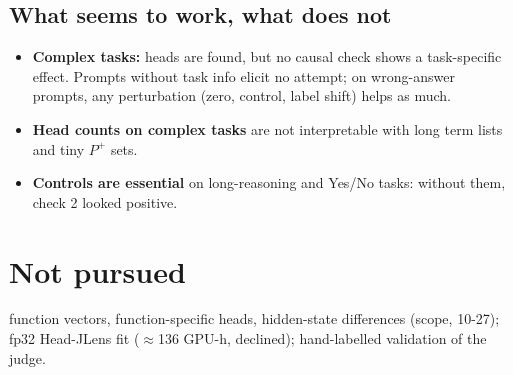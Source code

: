 \documentclass[10pt,a4paper]{article}
\newcommand{\no}{\textcolor{red!70!black}{\ding{55}}}
\begin{document}
\subsection{What seems to work, what does not}

\begin{itemize}
\item \no{} \textbf{Complex tasks:} heads are found, but no causal check shows a task-specific effect. Prompts without task info elicit no attempt; on wrong-answer prompts, any perturbation (zero, control, label shift) helps as much.
\item \no{} \textbf{Head counts on complex tasks} are not interpretable with long term lists and tiny $P^+$ sets.
\item \textbf{Controls are essential} on long-reasoning and Yes/No tasks: without them, check 2 looked positive.
\end{itemize}

\section{Not pursued}
function vectors, function-specific heads, hidden-state differences (scope, 10-27); fp32 Head-JLens fit ($\approx$136 GPU-h, declined); hand-labelled validation of the judge.
\end{document}
